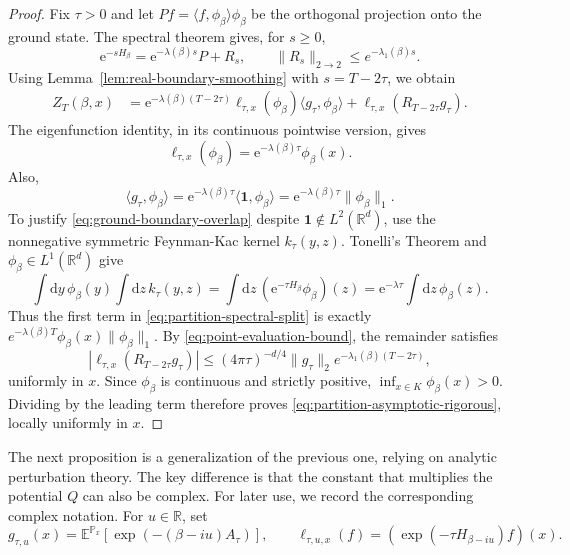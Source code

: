 \documentclass[11pt,reqno]{amsart}
\theoremstyle{definition}
\numberwithin{equation}{section}
\newcommand{\<}{\langle}
\renewcommand{\>}{\rangle}
\def\de{{\rm d}}
\def\de{{\mathrm {d}}}
\def\bbP{{\mathbb{P}}}
\begin{document}
\begin{proof}
Fix  $\tau>0 $ and let  $P f=\langle f,\phi_\beta\rangle\phi_\beta $ be the
orthogonal projection onto the ground state.  The spectral theorem gives,
for  $s\ge0 $,
\[
 \mathrm e^{-sH_\beta}=\mathrm e^{-\lambda(\beta) s}P+R_s,
 \qquad \|R_s\|_{2\to2}\le e^{-\lambda_1 (\beta)s}.
\]
Using Lemma~\ref{lem:real-boundary-smoothing} with  $s=T-2\tau $, we obtain
\begin{align}
 Z_T(\beta,x)
 &=\mathrm e^{-\lambda(\beta)(T-2\tau)}
   \ell_{\tau,x}(\phi_\beta)\langle g_\tau,\phi_\beta\rangle
   +\ell_{\tau,x}(R_{T-2\tau}g_\tau).
 \label{eq:partition-spectral-split}
\end{align}
The eigenfunction identity, in its continuous pointwise version, gives
\[
 \ell_{\tau,x}(\phi_\beta )=\mathrm e^{-\lambda(\beta)\tau}\phi_\beta (x).
\]
Also,
\begin{equation}
 \langle g_\tau,\phi_\beta \rangle
 =\mathrm e^{-\lambda (\beta)\tau}\langle \mathbf 1,\phi_\beta \rangle 
 =\mathrm e^{-\lambda (\beta)\tau}\|\phi_\beta \|_1 .
 \label{eq:ground-boundary-overlap}
\end{equation}
To justify \eqref{eq:ground-boundary-overlap} despite  $\mathbf 1\notin L^2(\mathbb R^d) $, use
the nonnegative symmetric Feynman-Kac kernel  $k_\tau(y,z) $.  Tonelli's Theorem and  $\phi_\beta\in L^1(\mathbb R^d) $ give
\[
 \int \de y \, \phi_\beta (y)\!\int \de z \, k_\tau(y,z)
 =\int \de z \,(\mathrm e^{-\tau H_\beta}\phi_\beta )(z)
 =\mathrm e^{-\lambda\tau}\int \de z\,\phi_\beta (z).
\]
Thus the first term in \eqref{eq:partition-spectral-split} is exactly
 $e^{-\lambda(\beta) T}\phi_\beta (x)\|\phi_\beta \|_1 $.  By
\eqref{eq:point-evaluation-bound}, the remainder satisfies
\[
 \left|\ell_{\tau,x}(R_{T-2\tau}g_\tau)\right|
 \le (4\pi\tau)^{-d/4}\|g_\tau\|_2
      e^{-\lambda_1 (\beta)(T-2\tau)},
\]
uniformly in  $x $.  Since  $\phi_\beta  $ is continuous and strictly positive,
 $\inf_{x\in K}\phi_\beta (x)>0 $.  Dividing by the leading term therefore
proves \eqref{eq:partition-asymptotic-rigorous}, locally uniformly in  $x $.
\end{proof}
The next proposition is a generalization of the previous one, relying on analytic perturbation theory. The key difference is that the constant that multiplies the potential $Q$ can also be complex.
For later use, we record the corresponding complex notation. For  $u\in\mathbb R $, set\[g_{\tau,u}(x)=\mathbb E^{\bbP_x}\left[\exp\left(-(\beta-iu)A_\tau\right)\right],\qquad\ell_{\tau,u,x}(f)=\left(\exp\left(-\tau H_{\beta-iu}\right)f\right)(x).\]
\end{document}
